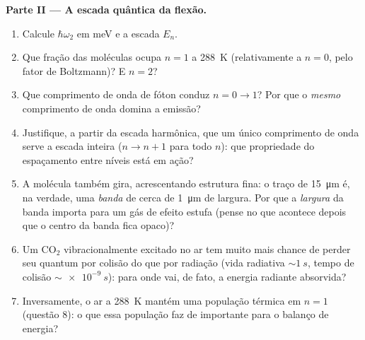 \begin{problem}
\medskip\noindent\textbf{Parte II --- A escada quântica da flexão.}
\begin{enumerate}[resume]
  \item Calcule $\hbar\omega_2$ em meV e a escada $E_n$.
  \item Que fração das moléculas ocupa $n = 1$ a \qty{288}{K}
        (relativamente a $n = 0$, pelo fator de Boltzmann)? E
        $n = 2$?
  \item Que comprimento de onda de fóton conduz $n = 0 \to 1$? Por que
        o \emph{mesmo} comprimento de onda domina a emissão?
  \item Justifique, a partir da escada harmônica, que um único
        comprimento de onda serve a escada inteira ($n \to n + 1$ para
        todo $n$): que propriedade do espaçamento entre níveis está em
        ação?
  \item A molécula também gira, acrescentando estrutura fina: o traço
        de \qty{15}{\micro m} é, na verdade, uma \emph{banda} de cerca
        de \qty{1}{\micro m} de largura. Por que a \emph{largura} da
        banda importa para um gás de efeito estufa (pense no que
        acontece depois que o centro da banda fica opaco)?
  \item Um CO$_2$ vibracionalmente excitado no ar tem muito mais
        chance de perder seu quantum por colisão do que por radiação
        (vida radiativa $\sim\qty{1}{s}$, tempo de colisão
        $\sim\qty{e-9}{s}$): para onde vai, de fato, a energia
        radiante absorvida?
  \item Inversamente, o ar a \qty{288}{K} mantém uma população térmica
        em $n = 1$ (questão 8): o que essa população faz de importante
        para o balanço de energia?
\end{enumerate}


\end{problem}
